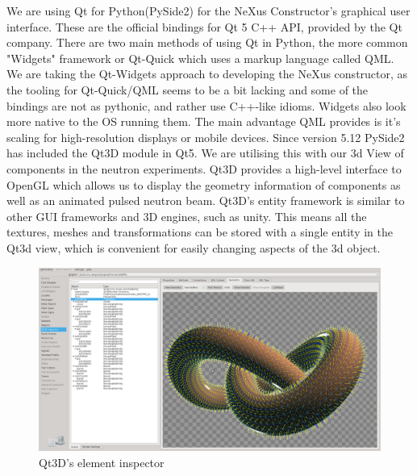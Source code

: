 We are using Qt for Python(PySide2) for the NeXus Constructor's graphical user interface. These are the official bindings for Qt 5 C++ API, provided by the Qt company.
\bigskip
There are two main methods of using Qt in Python, the more common "Widgets" framework or Qt-Quick which uses a markup language called QML.
We are taking the Qt-Widgets approach to developing the NeXus constructor, as the tooling for Qt-Quick/QML seems to be a bit lacking and some of the bindings are not as pythonic, and rather use C++-like idioms. Widgets also look more native to the OS running them. The main advantage QML provides is it's scaling for high-resolution displays or mobile devices.
\bigskip
Since version 5.12 PySide2 has included the Qt3D module in Qt5. We are utilising this with our 3d View of components in the neutron experiments. Qt3D provides a high-level interface to OpenGL which allows us to display the geometry information of components as well as an animated pulsed neutron beam. Qt3D's entity framework is similar to other GUI frameworks and 3D engines, such as unity. This means all the textures, meshes and transformations can be stored with a single entity in the Qt3d view, which is convenient for easily changing aspects of the 3d object. 
\bigskip
\begin{figure}
\caption{Qt3D's element inspector}
\includegraphics[width=\linewidth]{qt3d.png}
\end{figure}
\bigskip



